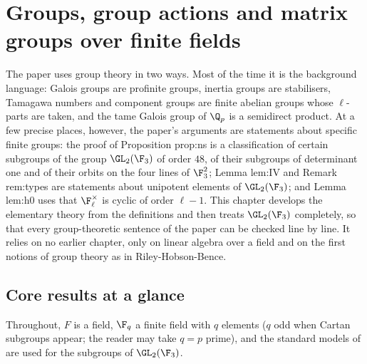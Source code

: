\chapter{Groups, group actions and matrix groups over finite fields}\label{ch:groups}

The paper uses group theory in two ways. Most of the time it is the background language: Galois groups
are profinite groups, inertia groups are stabilisers, Tamagawa numbers and component groups are finite
abelian groups whose $\ell$-parts are taken, and the tame Galois group of $\Q_p$ is a semidirect product.
At a few precise places, however, the paper's arguments are statements about specific finite groups: the
proof of Proposition prop:ns is a classification of certain subgroups of the group $\GL_2(\F_3)$ of order
$48$, of their subgroups of determinant one and of their orbits on the four lines of $\F_3^2$; Lemma lem:IV
and Remark rem:types are statements about unipotent elements of $\GL_2(\F_3)$; and Lemma lem:h0 uses that
$\F_\ell^\times$ is cyclic of order $\ell-1$. This chapter develops the elementary theory from the
definitions and then treats $\GL_2(\F_3)$ completely, so that every group-theoretic sentence of the paper
can be checked line by line. It relies on no earlier chapter, only on linear algebra over a field and on
the first notions of group theory as in Riley-Hobson-Bence.

\section*{Core results at a glance}

Throughout, $F$ is a field, $\F_q$ a finite field with $q$ elements ($q$ odd when Cartan subgroups appear;
the reader may take $q=p$ prime), and the standard models of  are used for the
subgroups of $\GL_2(\F_3)$.

